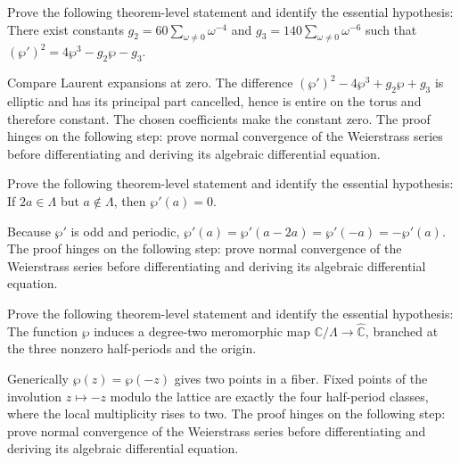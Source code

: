 \begin{problem}\label{prob:iv29-problem-09}
Prove the following theorem-level statement and identify the essential hypothesis: There exist constants $g_2=60\sum_{\omega\ne0}\omega^{-4}$ and $g_3=140\sum_{\omega\ne0}\omega^{-6}$ such that $(\wp')^2=4\wp^3-g_2\wp-g_3$.
\end{problem}
\begin{solution}
Compare Laurent expansions at zero. The difference $(\wp')^2-4\wp^3+g_2\wp+g_3$ is elliptic and has its principal part cancelled, hence is entire on the torus and therefore constant. The chosen coefficients make the constant zero. The proof hinges on the following step: prove normal convergence of the Weierstrass series before differentiating and deriving its algebraic differential equation.
\end{solution}

\begin{problem}\label{prob:iv29-problem-10}
Prove the following theorem-level statement and identify the essential hypothesis: If $2a\in\Lambda$ but $a\notin\Lambda$, then $\wp'(a)=0$.
\end{problem}
\begin{solution}
Because $\wp'$ is odd and periodic, $\wp'(a)=\wp'(a-2a)=\wp'(-a)=-\wp'(a)$. The proof hinges on the following step: prove normal convergence of the Weierstrass series before differentiating and deriving its algebraic differential equation.
\end{solution}

\begin{problem}\label{prob:iv29-problem-11}
Prove the following theorem-level statement and identify the essential hypothesis: The function $\wp$ induces a degree-two meromorphic map $\mathbb C/\Lambda\to\widehat{\mathbb C}$, branched at the three nonzero half-periods and the origin.
\end{problem}
\begin{solution}
Generically $\wp(z)=\wp(-z)$ gives two points in a fiber. Fixed points of the involution $z\mapsto-z$ modulo the lattice are exactly the four half-period classes, where the local multiplicity rises to two. The proof hinges on the following step: prove normal convergence of the Weierstrass series before differentiating and deriving its algebraic differential equation.
\end{solution}

